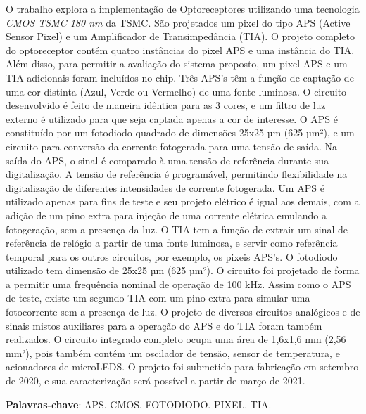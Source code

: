 
\setlength{\absparsep}{18pt} %
\begin{resumo}

O trabalho explora a implementação de Optoreceptores utilizando uma tecnologia \textit{CMOS TSMC 180 nm} da TSMC. São projetados um pixel do tipo APS (Active Sensor Pixel) e um Amplificador de Transimpedância (TIA). O projeto completo do optoreceptor contém quatro instâncias do pixel APS e uma instância do TIA. Além disso, para permitir a avaliação do sistema proposto, um pixel APS e um TIA adicionais foram incluídos no chip. Três APS’s t\^em a função de captação de uma cor distinta (Azul, Verde ou Vermelho) de uma fonte luminosa. O circuito desenvolvido é feito de maneira idêntica para as 3 cores, e um filtro de luz externo é utilizado para que seja captada apenas a cor de interesse. O APS é constituído por um fotodiodo quadrado de dimensões 25x25 µm (625 µm²), e um circuito para conversão da corrente fotogerada para uma tensão de saída. Na saída do APS, o sinal é comparado à uma tensão de referência durante sua digitalização. A tensão de referência é programável, permitindo flexibilidade na digitalização de diferentes intensidades de corrente fotogerada. Um APS é utilizado apenas para fins de teste e seu projeto elétrico é igual aos demais, com a adição de um pino extra para injeção de uma corrente elétrica emulando a fotogeração, sem a presença da luz. O TIA tem a função de extrair um sinal de referência de relógio a partir de uma fonte luminosa, e servir como referência temporal para os outros circuitos, por exemplo, os pixeis APS’s. O fotodiodo utilizado tem dimensão de 25x25 µm (625 µm²). O circuito foi projetado de forma a permitir uma frequência nominal de operação de 100 kHz. Assim como o APS de teste, existe um segundo TIA com um pino extra para simular uma fotocorrente sem a presença de luz. O projeto de diversos circuitos analógicos e de sinais mistos auxiliares para a operação do APS e do TIA foram também realizados. O circuito integrado completo ocupa uma área de 1,6x1,6 mm (2,56 mm²), pois também contém um oscilador de tensão, sensor de temperatura, e acionadores de microLEDS. O projeto foi submetido para fabricação em setembro de 2020, e sua caracterização será possível a partir de março de 2021.

\vspace{\onelineskip}
 
   \noindent 

 \textbf{Palavras-chave}: APS. CMOS. FOTODIODO. PIXEL. TIA.
\end{resumo}